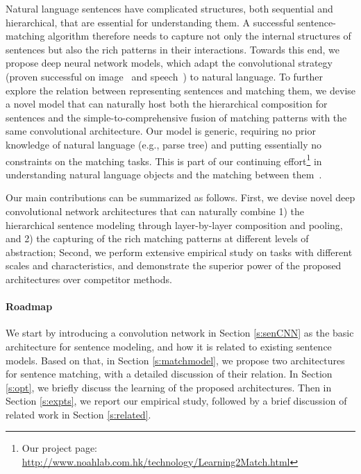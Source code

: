\documentclass{article} %
\begin{document}
Natural language sentences have complicated structures, both sequential and hierarchical, that are essential for understanding them. A successful sentence-matching algorithm therefore needs to capture not only the internal structures of sentences but also the rich patterns in their interactions. Towards this end, we propose deep neural network models, which adapt the convolutional strategy (proven successful on image~\cite{cnn} and speech~\cite{cnn_speech}) to natural language. To further explore the relation between representing sentences and matching them, we devise a novel model that can naturally host both the hierarchical composition for  sentences and the simple-to-comprehensive fusion of matching patterns with the same convolutional architecture. Our model is generic, requiring no prior knowledge of natural language (e.g., parse tree) and putting essentially no constraints on the matching tasks. This is part of our continuing effort\footnote{Our project page: \url{http://www.noahlab.com.hk/technology/Learning2Match.html}} in understanding natural language objects and the matching between them~\cite{nipsmatch, emnlpmatch}.



Our main contributions can be summarized as follows. First, we devise novel deep convolutional network architectures that can naturally combine 1) the hierarchical sentence modeling through layer-by-layer composition and pooling, and 2) the capturing of the rich matching patterns at different levels of abstraction; Second, we perform extensive empirical study on tasks with different scales and characteristics, and demonstrate the superior power of the proposed architectures over competitor methods.

\paragraph{Roadmap} We start by  introducing a convolution network  in Section \ref{s:senCNN} as the basic architecture for sentence modeling, and how it is related to existing sentence models. Based on that, in Section \ref{s:matchmodel}, we propose two architectures for sentence matching, with a detailed discussion of their relation. In Section \ref{s:opt}, we briefly discuss the learning of the proposed architectures. Then in Section \ref{s:expts}, we report our empirical study, followed by a brief discussion of related work in Section \ref{s:related}.
\end{document}
